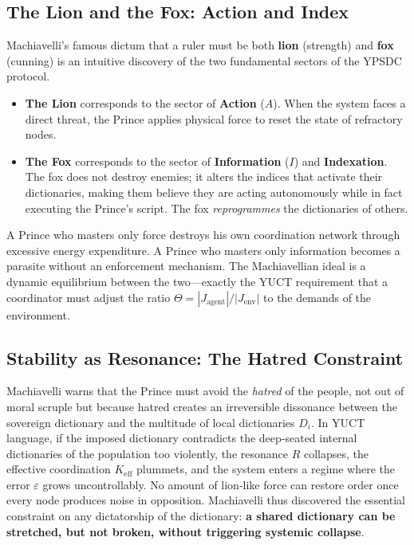 \documentclass[12pt,a4paper]{article}
\newcommand{\Keff}{K_{\mathrm{eff}}}
\begin{document}
	\subsection{The Lion and the Fox: Action and Index}
	
	Machiavelli’s famous dictum that a ruler must be both \textbf{lion} (strength) and \textbf{fox} (cunning) is an intuitive discovery of the two fundamental sectors of the YPSDC protocol.
	
	\begin{itemize}[leftmargin=*]
		\item \textbf{The Lion} corresponds to the sector of \textbf{Action} (\(A\)). When the system faces a direct threat, the Prince applies physical force to reset the state of refractory nodes.
		\item \textbf{The Fox} corresponds to the sector of \textbf{Information} (\(I\)) and \textbf{Indexation}. The fox does not destroy enemies; it alters the indices that activate their dictionaries, making them believe they are acting autonomously while in fact executing the Prince’s script. The fox \emph{reprogrammes} the dictionaries of others.
	\end{itemize}
	
	A Prince who masters only force destroys his own coordination network through excessive energy expenditure. A Prince who masters only information becomes a parasite without an enforcement mechanism. The Machiavellian ideal is a dynamic equilibrium between the two---exactly the YUCT requirement that a coordinator must adjust the ratio \(\Theta = |J_{\mathrm{agent}}|/|J_{\mathrm{env}}|\) to the demands of the environment.
	
	\subsection{Stability as Resonance: The Hatred Constraint}
	
	Machiavelli warns that the Prince must avoid the \emph{hatred} of the people, not out of moral scruple but because hatred creates an irreversible dissonance between the sovereign dictionary and the multitude of local dictionaries \(D_i\). In YUCT language, if the imposed dictionary contradicts the deep‑seated internal dictionaries of the population too violently, the resonance \(R\) collapses, the effective coordination \(\Keff\) plummets, and the system enters a regime where the error \(\varepsilon\) grows uncontrollably. No amount of lion‑like force can restore order once every node produces noise in opposition. Machiavelli thus discovered the essential constraint on any dictatorship of the dictionary: \textbf{a shared dictionary can be stretched, but not broken, without triggering systemic collapse}.
	
\end{document}

